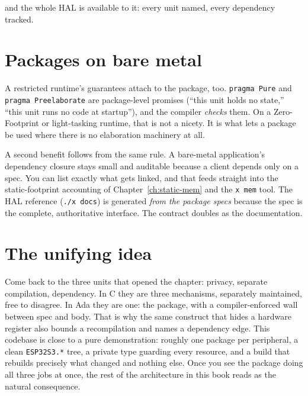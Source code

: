 \noindent
and the whole HAL is available to it: every unit named, every dependency tracked.

\section{Packages on bare metal}

A restricted runtime's guarantees attach to the package, too. \texttt{pragma Pure}
and \texttt{pragma Preelaborate} are package-level promises (``this unit holds no
state,'' ``this unit runs no code at startup''), and the compiler \emph{checks} them.
On a Zero-Footprint or light-tasking runtime, that is not a nicety. It is what lets a
package be used where there is no elaboration machinery at all.

A second benefit follows from the same rule. A bare-metal application's dependency
closure stays small and auditable because a client depends only on a spec. You can
list exactly what gets linked, and that feeds straight into the static-footprint
accounting of Chapter~\ref{ch:static-mem} and the \texttt{x mem} tool. The HAL
reference (\texttt{./x docs}) is generated \emph{from the package specs} because the
spec is the complete, authoritative interface. The contract doubles as the
documentation.

\section{The unifying idea}

Come back to the three units that opened the chapter: privacy, separate compilation,
dependency. In C they are three mechanisms, separately maintained, free to disagree.
In Ada they are one: the package, with a compiler-enforced wall between spec and
body. That is why the same construct that hides a hardware register also bounds a
recompilation and names a dependency edge. This codebase is close to a pure
demonstration: roughly one package per peripheral, a clean \texttt{ESP32S3.*} tree, a
private type guarding every resource, and a build that rebuilds precisely what
changed and nothing else. Once you see the package doing all three jobs at once, the
rest of the architecture in this book reads as the natural consequence.
